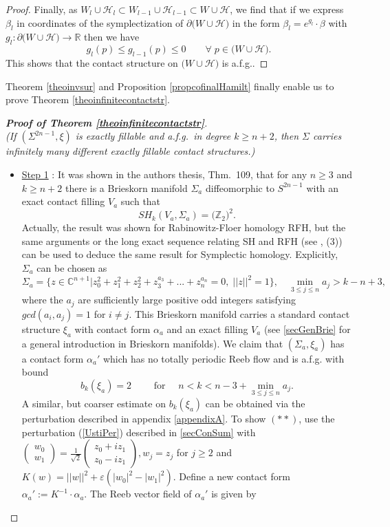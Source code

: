 \documentclass[a4paper,12pt,bibliography=totocnumbered,titlepage=false,abstracton,bookmarksnumbered=true]{scrartcl}
\newcommand{\veps}{\varepsilon}
\theoremstyle{definition}
\begin{document}
\begin{proof}
 Finally, as $W_l{\cup}\mathcal{H}_l\subset W_{l-1}{\cup}\mathcal{H}_{l-1}\subset W{\cup}\mathcal{H}$, we find that if we express $\beta_l$ in coordinates of the symplectization of $\partial\big(W{\cup}\mathcal{H}\big)$ in the form $\beta_l=e^{g_l}{\cdot}\beta$ with $g_l:\partial\big(W{\cup}\mathcal{H}\big)\rightarrow\mathbb{R}$ then we have
 \[g_l(p)\leq g_{l-1}(p)\leq 0\qquad\forall\; p\in \big(W{\cup}\mathcal{H}\big).\]
 This shows that the contact structure on $\big(W{\cup}\mathcal{H}\big)$ is a.f.g..
\end{proof}

Theorem \ref{theoinvsur} and Proposition \ref{propcofinalHamilt} finally enable us to prove Theorem \ref{theoinfinitecontactstr}.
\begin{proof}[\textnormal{\textbf{Proof of Theorem \ref{theoinfinitecontactstr}}}]~\\
\textit{(If $(\Sigma^{2n-1},\xi)$ is exactly fillable and a.f.g.\ in degree $k\geq n{+}2$, then $\Sigma$ carries infinitely many different exactly fillable contact structures.)}
\begin{itemize}
 \item \underline{Step 1} : It was shown in the authors thesis, \cite{FauckThesis} Thm.\ 109, that for any $n\geq 3$ and $k\geq n{+}2$ there is a Brieskorn manifold $\Sigma_a$ diffeomorphic to $S^{2n-1}$ with an exact contact filling $V_a$ such that 
 \[SH_k(V_a,\Sigma_a)=\big(\mathbb{Z}_2\big)^2.\tag{$\ast$}\]
 Actually, the result was shown for Rabinowitz-Floer homology RFH, but the same arguments or the long exact sequence relating SH and RFH (see \cite{FraCieOan}, (3)) can be used to deduce the same result for Symplectic homology. Explicitly, $\Sigma_a$ can be chosen as
  \[\Sigma_a=\Big\{z{\in}\mathbb{C}^{n+1}\Big|z_0^2{+}z_1^2{+}z_2^2{+}z^{a_3}_3{+}...{+}z^{a_n}_n=0,\;||z||^2{=}1\Big\}, \quad \min_{3\leq j\leq n} a_j > k{-}n{+}3,\]
  where the $a_j$ are sufficiently large positive odd integers satisfying $gcd(a_i,a_j)=1$ for $i\neq j$. This Brieskorn manifold carries a standard contact structure $\xi_a$ with contact form $\alpha_a$ and an exact filling $V_a$ (see \ref{secGenBrie} for a general introduction in Brieskorn manifolds). We claim that $(\Sigma_a,\xi_a)$ has a contact form $\alpha_a'$ which has no totally periodic Reeb flow and is a.f.g. with bound
  \[b_k(\xi_a)=2\qquad \text{ for }\quad n<k<n{-}3+\min_{3\leq j\leq n} a_j.\tag{$\ast\ast$}\]
  A similar, but coarser estimate on $b_k(\xi_a)$ can be obtained via the perturbation described in appendix \ref{appendixA}. To show $(\ast\ast)$, use the perturbation (\ref{UstiPer}) described in \ref{secConSum} with $\left(\begin{smallmatrix} w_0\\ w_1\end{smallmatrix}\right)=\frac{1}{\sqrt{2}}\left(\begin{smallmatrix} z_0+iz_1\\ z_0-iz_1\end{smallmatrix}\right), w_j=z_j$ for $j\geq 2$ and $K(w)=||w||^2+\veps(|w_0|^2-|w_1|^2)$. Define a new contact form $\alpha_a':=K^{-1}{\cdot}\alpha_a$. The Reeb vector field of $\alpha_a'$ is given by 

\end{itemize}
\end{proof}
\end{document}
